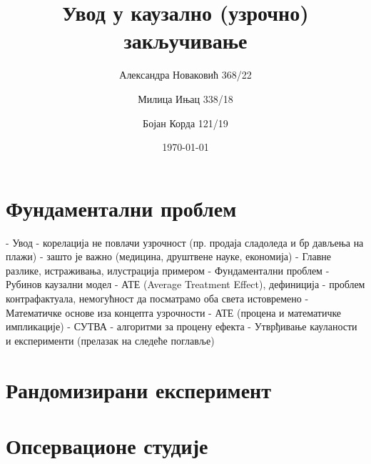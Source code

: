 \documentclass[12pt, a4paper]{article}
\title{Увод у каузално (узрочно) закључивање}
\author{Александра Новаковић 368/22}
\author{Милица Ињац 338/18}
\author{Бојан Корда 121/19}
\affil{Математички факултет, Универзитет у Београду}
\date{\today}
\begin{document}
\maketitle
\newpage

\tableofcontents
\newpage

\section{Фундаментални проблем}
- Увод
    - корелација не повлачи узрочност (пр. продаја сладоледа и бр дављења на плажи)
    - зашто је важно (медицина, друштвене науке, економија)
    - Главне разлике, истраживања, илустрација примером 
- Фундаментални проблем 
    - Рубинов каузални модел
    - АТЕ (Average Treatment Effect), дефиниција
    - проблем контрафактуала, немогућност да посматрамо оба света истовремено
- Математичке основе иза концепта узрочности
    - АТЕ (процена и математичке импликације)
    - СУТВА
    - алгоритми за процену ефекта
- Утврђивање кауланости и експерименти (прелазак на следеће поглавље) 

\newpage



\section{Рандомизирани експеримент}
\newpage



\section{Опсервационе студије}
\end{document}

